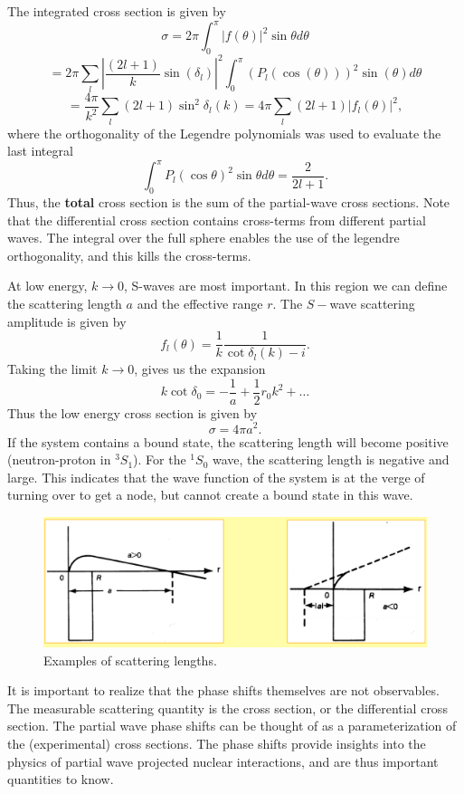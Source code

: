 \documentclass[%
oneside,                 %
final,                   %
10pt]{article}
\begin{document}
The integrated cross section is given by
\[
\sigma = 2\pi \int_0^{\pi} |f(\theta)|^2 \sin \theta d\theta 
\]
\[
=2\pi \sum_l |\frac{(2l+1)}{k} \sin(\delta_l)|^2 \int_0^{\pi} (P_l(\cos(\theta)))^2 \sin(\theta) d\theta\]
\[ 
= \frac{4\pi}{k^2} \sum_l (2l+1) \sin^2\delta_l(k) = 4\pi \sum_l (2l+1)|f_l(\theta)|^2, 
\]
where the orthogonality of the Legendre polynomials was used to evaluate the last integral
\[
\int_0^{\pi} P_l(\cos \theta)^2 \sin \theta d\theta = \frac{2}{2l+1}.
\]
Thus, the \textbf{total} cross section is the sum of the partial-wave cross sections. Note that the differential cross section contains cross-terms from different partial waves. The integral over the full sphere enables the use of the legendre orthogonality, and this kills the cross-terms.

At low energy, $k \rightarrow 0$, S-waves are most important. In this region we can define the scattering length $a$ and the effective range $r$. The $S-$wave scattering amplitude is given by
\[
f_l(\theta) = \frac{1}{k}\frac{1}{\cot \delta_l(k) - i}.
\]
Taking the limit $k \rightarrow 0$, gives us the expansion
\[
k \cot \delta_0 = -\frac{1}{a} + \frac{1}{2}r_0 k^2 + \ldots
\]
Thus the low energy cross section is given by
\[
\sigma = 4\pi a^2.
\]
If the system contains a bound state, the scattering length will become positive (neutron-proton in $^3S_1$). For the $^1S_0$ wave, the scattering length is negative and large. This indicates that the wave function of the system is at the verge of turning over to get a node, but cannot create a bound state in this wave.


\begin{figure}[t]
  \centerline{\includegraphics[width=1.0\linewidth]{fig-forces/scattering_length.png}}
  \caption{
  Examples of scattering lengths.
  }
\end{figure}


It is important to realize that the phase shifts themselves are not
observables. The measurable scattering quantity is the cross section,
or the differential cross section. The partial wave phase shifts can
be thought of as a parameterization of the (experimental) cross
sections. The phase shifts provide insights into the physics of
partial wave projected nuclear interactions, and are thus important
quantities to know.
\end{document}
